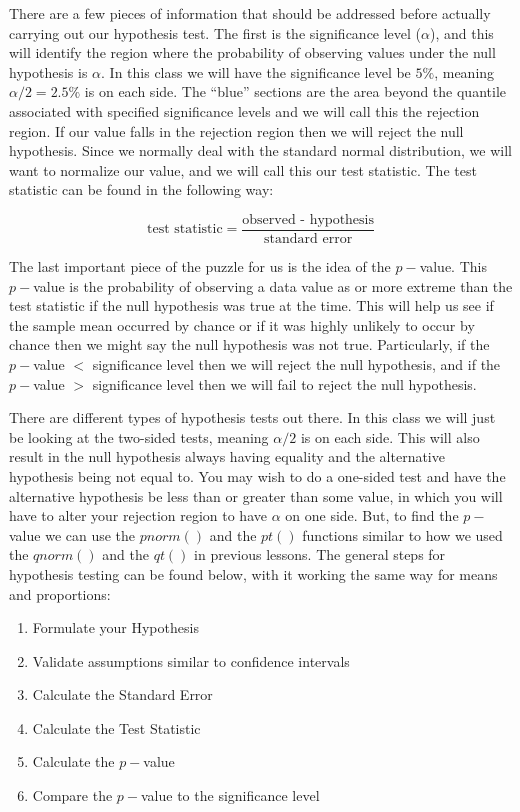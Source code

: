 \documentclass[
  letterpaper,
  DIV=11,
  numbers=noendperiod]{scrreprt}
\providecommand{\tightlist}{%
  \setlength{\itemsep}{0pt}\setlength{\parskip}{0pt}}
\begin{document}
There are a few pieces of information that should be addressed before
actually carrying out our hypothesis test. The first is the significance
level (\(\alpha\)), and this will identify the region where the
probability of observing values under the null hypothesis is \(\alpha\).
In this class we will have the significance level be \(5\%\), meaning
\(\alpha/2 = 2.5\%\) is on each side. The ``blue'' sections are the area
beyond the quantile associated with specified significance levels and we
will call this the rejection region. If our value falls in the rejection
region then we will reject the null hypothesis. Since we normally deal
with the standard normal distribution, we will want to normalize our
value, and we will call this our test statistic. The test statistic can
be found in the following way:

\[ \text{test statistic} = \frac{\text{observed - hypothesis}}{\text{standard error}} \]

The last important piece of the puzzle for us is the idea of the
\(p-\)value. This \(p-\)value is the probability of observing a data
value as or more extreme than the test statistic if the null hypothesis
was true at the time. This will help us see if the sample mean occurred
by chance or if it was highly unlikely to occur by chance then we might
say the null hypothesis was not true. Particularly, if the \(p-\)value
\(<\) significance level then we will reject the null hypothesis, and if
the \(p-\)value \(>\) significance level then we will fail to reject the
null hypothesis.

There are different types of hypothesis tests out there. In this class
we will just be looking at the two-sided tests, meaning \(\alpha/2\) is
on each side. This will also result in the null hypothesis always having
equality and the alternative hypothesis being not equal to. You may wish
to do a one-sided test and have the alternative hypothesis be less than
or greater than some value, in which you will have to alter your
rejection region to have \(\alpha\) on one side. But, to find the
\(p-\)value we can use the \(pnorm()\) and the \(pt()\) functions
similar to how we used the \(qnorm()\) and the \(qt()\) in previous
lessons. The general steps for hypothesis testing can be found below,
with it working the same way for means and proportions:

\begin{enumerate}
\def\labelenumi{\arabic{enumi}.}
\tightlist
\item
  Formulate your Hypothesis
\item
  Validate assumptions similar to confidence intervals
\item
  Calculate the Standard Error
\item
  Calculate the Test Statistic
\item
  Calculate the \(p-\)value
\item
  Compare the \(p-\)value to the significance level
\end{enumerate}
\end{document}
